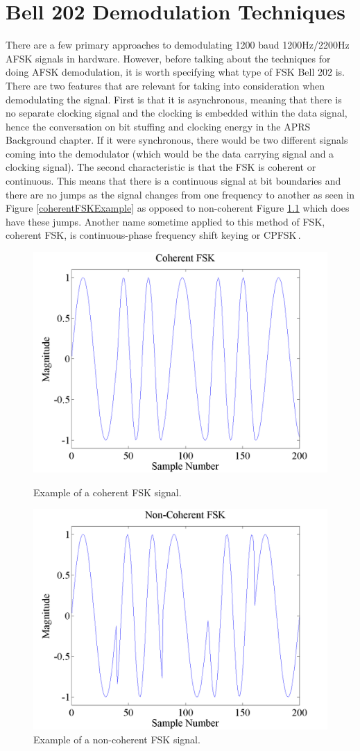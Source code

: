 \chapter{Bell 202 Demodulation Techniques}
There are a few primary approaches to demodulating 1200 baud 1200Hz/2200Hz AFSK signals in hardware.  However, before talking about the techniques for doing AFSK demodulation, it is worth specifying what type of FSK Bell 202 is. There are two features that are relevant for taking into consideration when demodulating the signal. First is that it is asynchronous, meaning that there is no separate clocking signal and the clocking is embedded within the data signal, hence the conversation on bit stuffing and clocking energy in the APRS Background chapter. If it were synchronous, there would be two different signals coming into the demodulator (which would be the data carrying signal and a clocking signal). The second characteristic is that the FSK is coherent or continuous. This means that there is a continuous signal at bit boundaries and there are no jumps as the signal changes from one frequency to another as seen in Figure \ref{coherentFSKExample} as opposed to non-coherent Figure \ref{noncoherentFSKExample} which does have these jumps. Another name sometime applied to this method of FSK, coherent FSK, is continuous-phase frequency shift keying or CPFSK\,\cite{WikipediaCPFSK}.

\begin{figure}
	\centering
	\includegraphics[width=0.75\linewidth]{images/CoherentFSK.png} 
	\caption{Example of a coherent FSK signal.}
	\label{coherentFSKExample}
	\vspace{15mm}
	\includegraphics[width=0.75\linewidth]{images/NonCoherentFSK.png} 
	\caption{Example of a non-coherent FSK signal.}
	\label{noncoherentFSKExample}
\end{figure}

